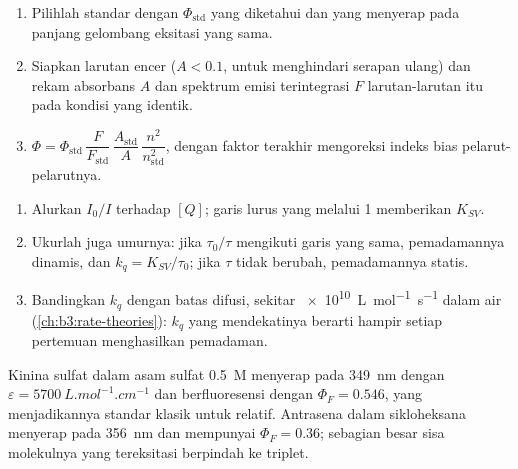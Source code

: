 \begin{method}\label{met:b3:electronic-spectroscopy:relative-yield}
\begin{enumerate}
  \item Pilihlah standar dengan $\Phi_{\mathrm{std}}$ yang diketahui dan yang
        menyerap pada panjang gelombang eksitasi yang sama.
  \item Siapkan larutan encer ($A < 0.1$, untuk menghindari serapan ulang) dan
        rekam absorbans $A$ dan spektrum emisi terintegrasi $F$ larutan-larutan
        itu pada kondisi yang identik.
  \item $\Phi = \Phi_{\mathrm{std}}\,\dfrac{F}{F_{\mathrm{std}}}\,\dfrac{A_{\mathrm{std}}}{A}\,
        \dfrac{n^2}{n_{\mathrm{std}}^2}$, dengan faktor terakhir mengoreksi indeks bias
        pelarut-pelarutnya.
\end{enumerate}
\end{method}

\begin{method}\label{met:b3:electronic-spectroscopy:stern-volmer}
\begin{enumerate}
  \item Alurkan $I_0/I$ terhadap $[Q]$; garis lurus yang melalui 1 memberikan
        $K_{SV}$.
  \item Ukurlah juga umurnya: jika $\tau_0/\tau$ mengikuti garis yang sama,
        pemadamannya dinamis, dan $k_q = K_{SV}/\tau_0$; jika $\tau$ tidak
        berubah, pemadamannya statis.
  \item Bandingkan $k_q$ dengan batas difusi, sekitar
        \qty{e10}{L.mol^{-1}.s^{-1}} dalam air (\cref{ch:b3:rate-theories}):
        $k_q$ yang mendekatinya berarti hampir setiap pertemuan menghasilkan
        pemadaman.
\end{enumerate}
\end{method}

\begin{example}\label{ex:b3:electronic-spectroscopy:quinine}
Kinina sulfat dalam asam sulfat \qty{0.5}{M} menyerap pada \qty{349}{nm} dengan
$\varepsilon =
\qty{5700}{L.mol^{-1}.cm^{-1}}$ dan berfluoresensi dengan
$\Phi_F = 0.546$, yang menjadikannya standar klasik untuk 
relatif. Antrasena dalam sikloheksana menyerap pada \qty{356}{nm} dan
mempunyai $\Phi_F = 0.36$; sebagian besar sisa molekulnya yang tereksitasi
berpindah ke triplet.
\end{example}

